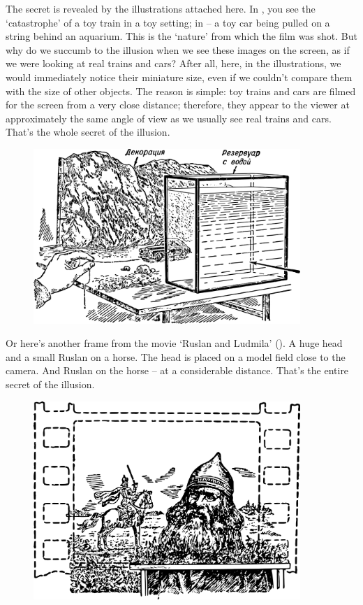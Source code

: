 The secret is revealed by the illustrations attached here. In , you see the `catastrophe' of a toy train in a toy setting; in  -- a toy car being pulled on a string behind an aquarium. This is the `nature' from which the film was shot. But why do we succumb to the illusion when we see these images on the screen, as if we were looking at real trains and cars? After all, here, in the illustrations, we would immediately notice their miniature size, even if we couldn't compare them with the size of other objects. The reason is simple: toy trains and cars are filmed for the screen from a very close distance; therefore, they appear to the viewer at approximately the same angle of view as we usually see real trains and cars. That's the whole secret of the illusion.

\begin{figure}[h!]
\centering
\includegraphics[width=0.9\textwidth]{figures/ch-03/fig-064.pdf}
\end{figure}

Or here's another frame from the movie `Ruslan and Ludmila' (). A huge head and a small Ruslan on a horse. The head is placed on a model field close to the camera. And Ruslan on the horse -- at a considerable distance. That's the entire secret of the illusion.

\begin{figure}[h!]
\centering
\includegraphics[width=0.9\textwidth]{figures/ch-03/fig-065.pdf}
\end{figure}

